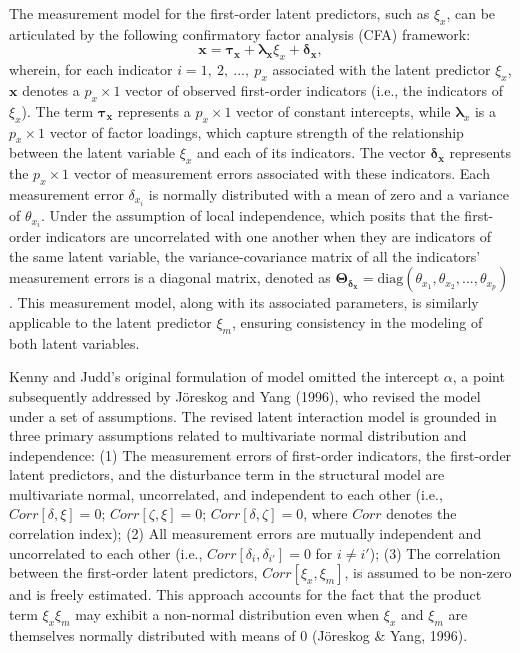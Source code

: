 \documentclass[
  man]{apa6}
\begin{document}
The measurement model for the first-order latent predictors, such as \(\xi_{x}\), can be articulated by the following confirmatory factor analysis (CFA) framework:
\begin{equation}
\mathbf{x} = \boldsymbol{\tau_{x}} + \boldsymbol{\lambda_{x}}\xi_{x} + \boldsymbol{\delta_{x}},
\end{equation}
wherein, for each indicator \(i = 1, \ 2, \ ..., \ p_{x}\) associated with the latent predictor \(\xi_{x}\), \(\mathbf{x}\) denotes a \(p_{x} \times 1\) vector of observed first-order indicators (i.e., the indicators of \(\xi_{x}\)). The term \(\boldsymbol{\tau_{x}}\) represents a \(p_{x} \times 1\) vector of constant intercepts, while \(\boldsymbol{\lambda}_{x}\) is a \(p_{x} \times 1\) vector of factor loadings, which capture strength of the relationship between the latent variable \(\xi_{x}\) and each of its indicators. The vector \(\boldsymbol{\delta_{x}}\) represents the \(p_{x} \times 1\) vector of measurement errors associated with these indicators. Each measurement error \(\delta_{x_{i}}\) is normally distributed with a mean of zero and a variance of \(\theta_{x_{i}}\). Under the assumption of local independence, which posits that the first-order indicators are uncorrelated with one another when they are indicators of the same latent variable, the variance-covariance matrix of all the indicators' measurement errors is a diagonal matrix, denoted as \(\mathbf{\Theta_{\delta_{x}}} = \text{diag}(\theta_{x_{1}}, \theta_{x_{2}}, ..., \theta_{x_{p}})\). This measurement model, along with its associated parameters, is similarly applicable to the latent predictor \(\xi_{m}\), ensuring consistency in the modeling of both latent variables.

Kenny and Judd's original formulation of model omitted the intercept \(\alpha\), a point subsequently addressed by Jöreskog and Yang (1996), who revised the model under a set of assumptions. The revised latent interaction model is grounded in three primary assumptions related to multivariate normal distribution and independence: (1) The measurement errors of first-order indicators, the first-order latent predictors, and the disturbance term in the structural model are multivariate normal, uncorrelated, and independent to each other (i.e., \(Corr[\delta, \xi] = 0\); \(Corr[\zeta, \xi] = 0\); \(Corr[\delta, \zeta] = 0\), where \(Corr\) denotes the correlation index); (2) All measurement errors are mutually independent and uncorrelated to each other (i.e., \(Corr[\delta_{i}, \delta_{i'}] = 0\) for \(i \neq i'\)); (3) The correlation between the first-order latent predictors, \(Corr[\xi_{x}, \xi_{m}]\), is assumed to be non-zero and is freely estimated. This approach accounts for the fact that the product term \(\xi_{x}\xi_{m}\) may exhibit a non-normal distribution even when \(\xi_{x}\) and \(\xi_{m}\) are themselves normally distributed with means of 0 (Jöreskog \& Yang, 1996).
\end{document}
